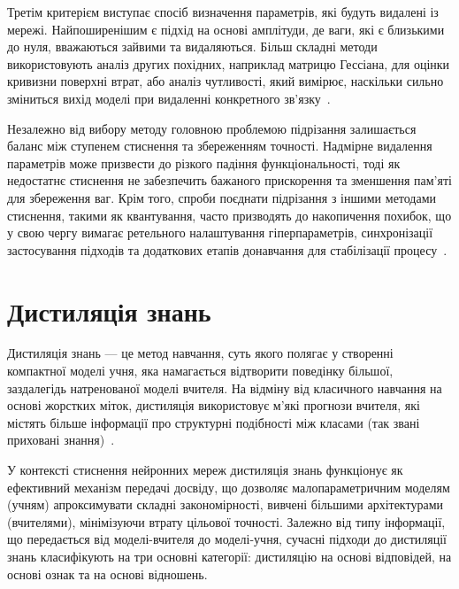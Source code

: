 \documentclass{pma-mthesis}
\begin{document}
Третім критерієм виступає спосіб визначення параметрів, які будуть видалені із мережі. Найпоширенішим є підхід на основі амплітуди, де ваги, які є близькими до нуля, вважаються зайвими та видаляються. Більш складні методи використовують аналіз других похідних, наприклад матрицю Гессіана, для оцінки кривизни поверхні втрат, або аналіз чутливості, який вимірює, наскільки сильно зміниться вихід моделі при видаленні конкретного зв’язку~\cite{cheng2024survey}. 

Незалежно від вибору методу головною проблемою підрізання залишається баланс між ступенем стиснення та збереженням точності. Надмірне видалення параметрів може призвести до різкого падіння функціональності, тоді як недостатнє стиснення не забезпечить бажаного прискорення та зменшення пам'яті для збереження ваг. Крім того, спроби поєднати підрізання з іншими методами стиснення, такими як квантування, часто призводять до накопичення похибок, що у свою чергу вимагає ретельного налаштування гіперпараметрів, синхронізації застосування підходів та додаткових етапів донавчання для стабілізації процесу~\cite{10946020}.

\section{Дистиляція знань}
\label{subsec:distillation}

Дистиляція знань --- це метод навчання, суть якого полягає у створенні компактної моделі учня, яка намагається відтворити поведінку більшої, заздалегідь натренованої моделі вчителя. На відміну від класичного навчання на основі жорстких міток, дистиляція використовує м’які прогнози вчителя, які містять більше інформації про структурні подібності між класами (так звані приховані знання)~\cite{hinton2014distilling}.

У контексті стиснення нейронних мереж дистиляція знань функціонує як ефективний механізм передачі досвіду, що дозволяє малопараметричним моделям (учням) апроксимувати складні закономірності, вивчені більшими архітектурами (вчителями), мінімізуючи втрату цільової точності. Залежно від типу інформації, що передається від моделі-вчителя до моделі-учня, сучасні підходи до дистиляції знань класифікують на три основні категорії: дистиляцію на основі відповідей, на основі ознак та на основі відношень. 
\end{document}
